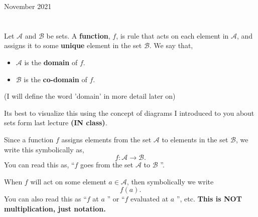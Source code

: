 \documentclass[12pt,oneside]{book} %
\begin{document}
	\renewcommand*{\term}{Term 2} %
	\renewcommand*{\coursecode}{MCR3U} %
	\renewcommand*{\coursename}{Course Name} %
	\renewcommand*{\thelecnum}{2} %
	\renewcommand*{\profname}{Prof Name} %
	\renewcommand*{\colink}{http://www.student.math.uwaterloo.ca/~c2kent} %
	\clearpage
	\pagestyle{classlecture}
\begin{lec}{November 2021}
	\chapter{\chapname\chaplec}
	\begin{mdframed}
		\begin{defn}
			Let $\mathcal{A}$ and $\mathcal{B}$  be sets. A  \textbf{function}, $f$, is rule that acts on each element in $\mathcal{A}$,
			and assigns it to some \textbf{unique} element in the set $\mathcal{B}$. We say that,
      \begin{itemize}
        \item $\mathcal{A}$ is the \textbf{domain} of $f$.
        \item $\mathcal{B}$ is the \textbf{co-domain} of $f$.
      \end{itemize}
		\end{defn}
    (I will define the word 'domain' in more detail later on)
	\end{mdframed}
	Its best to visualize this using the concept of diagrams I introduced to you about sets form last  lecture \textbf{(IN class)}.

	\begin{notn}
		Since a function $f$ assigns elements from the set $\mathcal{A}$ to elements in the set $\mathcal{B}$, we write this
		symbolically as,
		\[
					f \colon \mathcal{A} \to \mathcal{B}
		.\] 
		You can read this as, ``$f$ goes from the set $\mathcal{A}$ to $\mathcal{B}$ ''.
	\end{notn}

	\begin{notn}
			When $f$ will act on some element $a\in \mathcal{A}$, then symbolically we write
			\[
							f(a)
			.\] You can also read this as ``$f$ at $a$ '' or  ``$f$ evaluated at $a$ '', etc. \textbf{This is NOT multiplication, just
			notation.}
	\end{notn}


\end{lec}
\end{document}
